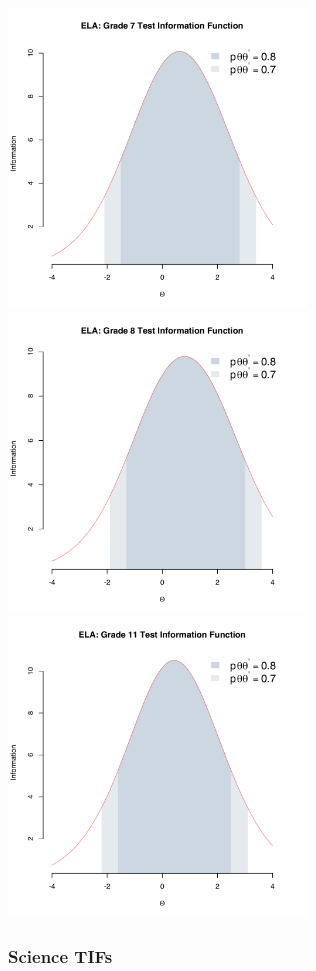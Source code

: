 \documentclass[]{article}
\begin{document}
\includegraphics[height=3.12500in]{tifs/ela7tif.pdf}
\includegraphics[height=3.12500in]{tifs/ela8tif.pdf}
\includegraphics[height=3.12500in]{tifs/ela11tif.pdf}

\subsubsection{Science TIFs}\label{science-tifs}
\end{document}

